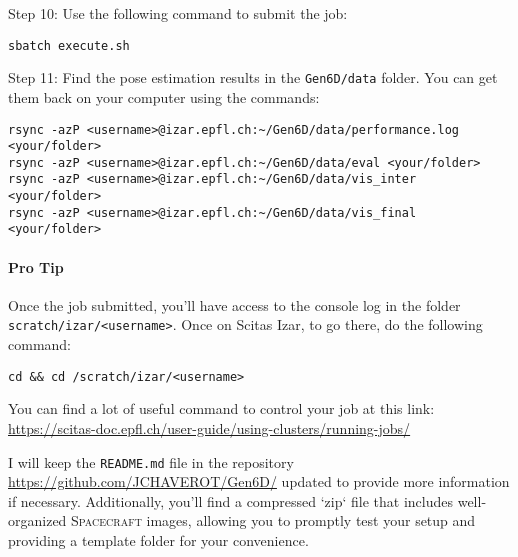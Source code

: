 \noindent Step 10: Use the following command to submit the job:
{ \captionsetup{labelformat=empty,labelsep=none}
\begin{lstlisting}[style=bashstyle, caption=\null]
sbatch execute.sh
\end{lstlisting}
}

\vspace{-0.4cm}

\noindent Step 11: Find the pose estimation results in the \texttt{Gen6D/data} folder. You can get them back on your computer using the commands:
{ \captionsetup{labelformat=empty,labelsep=none}
\begin{lstlisting}[style=bashstyle, caption=\null, keywordstyle=\color{black}]
rsync -azP <username>@izar.epfl.ch:~/Gen6D/data/performance.log <your/folder>
rsync -azP <username>@izar.epfl.ch:~/Gen6D/data/eval <your/folder>
rsync -azP <username>@izar.epfl.ch:~/Gen6D/data/vis_inter <your/folder>
rsync -azP <username>@izar.epfl.ch:~/Gen6D/data/vis_final <your/folder>
\end{lstlisting}
}

\vspace{-0.4cm}

\paragraph{Pro Tip} Once the job submitted, you'll have access to the console log in the folder \texttt{scratch/izar/<username>}. Once on Scitas Izar, to go there, do the following command:
{ \captionsetup{labelformat=empty,labelsep=none}
\begin{lstlisting}[style=bashstyle, caption=\null]
cd && cd /scratch/izar/<username>
\end{lstlisting}
}

\bigskip

\noindent You can find a lot of useful command to control your job at this link: \url{https://scitas-doc.epfl.ch/user-guide/using-clusters/running-jobs/}

\bigskip

\noindent I will keep the \texttt{README.md} file in the repository \url{https://github.com/JCHAVEROT/Gen6D/} updated to provide more information if necessary. Additionally, you'll find a compressed `zip` file that includes well-organized \textsc{Spacecraft} images, allowing you to promptly test your setup and providing a template folder for your convenience.


\cleardoublepage{}